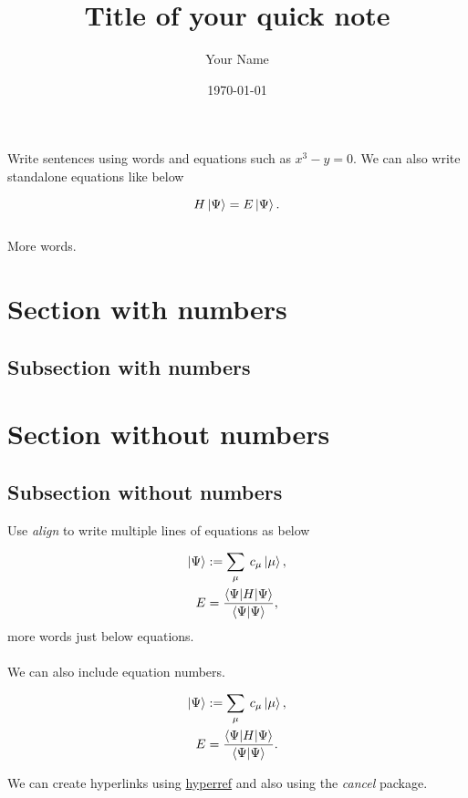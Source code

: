 \documentclass[22pt,a4paper,notitlepage]{article}
\begin{document}
\title{Title of your quick note}
\author{Your Name}
\date{\today} %
\maketitle


\noindent %
Write sentences using words and equations such as $x^3 - y = 0$. We can also write standalone equations like below

$$ H \ket{\Psi} = E \ket{\Psi}.
$$
\\ %
More words.

\section{Section with numbers}

\subsection{Subsection with numbers}

\section*{Section without numbers}

\subsection*{Subsection without numbers}

Use \textit{align} to write multiple lines of equations as below

\begin{align*}
\ket{\Psi} 
&:= \sum_{\mu} \: c_{\mu} \ket{\mu},
\\
E 
&= \frac{\braket{\Psi | H | \Psi}}{\braket{\Psi|\Psi}},
\end{align*}
more words just below equations.
\\ \\ %
We can also include equation numbers.

\begin{align}
\ket{\Psi} 
&:= \sum_{\mu} \: c_{\mu} \ket{\mu},
\\
E 
&= \frac{\braket{\Psi | H | \Psi}}{\braket{\Psi|\Psi}}.
\end{align}

\noindent
We can create hyperlinks using \href{https://www.overleaf.com/learn/latex/Hyperlinks}{hyperref} and also  using the \textit{cancel} package.
\end{document}
